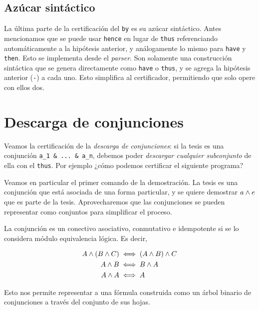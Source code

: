 \subsection{Azúcar sintáctico}

La última parte de la certificación del \lstinline{by} es su azúcar sintáctico. Antes mencionamos que se puede usar \lstinline{hence} en lugar de \lstinline{thus} referenciando automáticamente a la hipótesis anterior, y análogamente lo mismo para \lstinline{have} y \lstinline{then}. Esto se implementa desde el \textit{parser}. Son solamente una construcción sintáctica que se genera directamente como \lstinline{have} o \lstinline{thus}, y se agrega la hipótesis anterior (\lstinline{-}) a cada uno. Esto simplifica al certificador, permitiendo que solo opere con ellos dos.

\section{Descarga de conjunciones}

Veamos la certificación de la \textit{descarga de conjunciones}: si la tesis es una conjunción \lstinline{a_1 & ... & a_n}, debemos poder \textit{descargar cualquier subconjunto} de ella con el \lstinline{thus}. Por ejemplo ¿cómo podemos certificar el siguiente programa?



Veamos en particular el primer comando de la demostración. La tesis es una conjunción que está asociada de una forma particular, y se quiere demostrar $a \wedge e$ que es parte de la tesis. Aprovecharemos que las conjunciones se pueden representar como conjuntos para simplificar el proceso.

\begin{prop*}
    La conjunción es un conectivo asociativo, conmutativo e idempotente si se lo considera módulo equivalencia lógica. Es decir,

    \begin{align*}
        A \wedge (B \wedge C)
            &\iff (A \wedge B) \wedge C\\
        A \wedge B &\iff B \wedge A\\
        A \wedge A &\iff A
    \end{align*}

    Esto nos permite representar a una fórmula construida como un árbol binario de conjunciones a través del conjunto de sus hojas.
\end{prop*}

